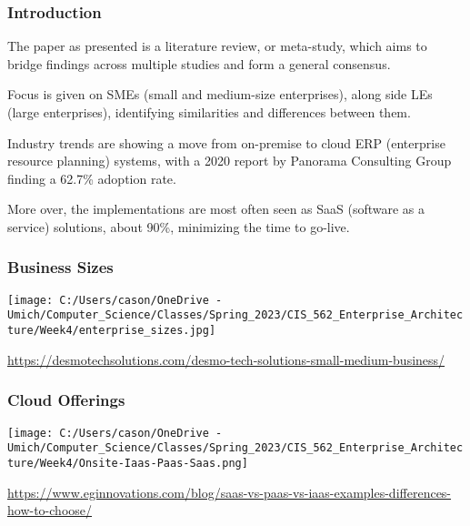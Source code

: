 \documentclass{beamer}
\begin{document}
\begin{frame}

    \frametitle{Introduction}

    The paper as presented is a literature review, or meta-study, which aims to bridge findings across multiple studies and form a general consensus. \pause

    \vspace{3.33mm}
    Focus is given on SMEs (small and medium-size enterprises), along side LEs (large enterprises), identifying similarities and differences between them. \pause

    \vspace{3.33mm}
    Industry trends are showing a move from on-premise to cloud ERP (enterprise resource planning) systems, with a 2020 report by Panorama Consulting Group finding a 62.7\% adoption rate. \pause
    
    \vspace{3.33mm}
    More over, the implementations are most often seen as SaaS (software as a service) solutions, about 90\%, minimizing the time to go-live.

\end{frame}

\begin{frame}

    \frametitle{Business Sizes}

    \centering
    \texttt{[image: C:/Users/cason/OneDrive - Umich/Computer\_Science/Classes/Spring\_2023/CIS\_562\_Enterprise\_Architecture/Week4/enterprise\_sizes.jpg]}

    \footnotesize {\url{https://desmotechsolutions.com/desmo-tech-solutions-small-medium-business/}}

\end{frame}

\begin{frame}

    \frametitle{Cloud Offerings}

    \centering
    \texttt{[image: C:/Users/cason/OneDrive - Umich/Computer\_Science/Classes/Spring\_2023/CIS\_562\_Enterprise\_Architecture/Week4/Onsite-Iaas-Paas-Saas.png]}

    \footnotesize {\url{https://www.eginnovations.com/blog/saas-vs-paas-vs-iaas-examples-differences-how-to-choose/}}

\end{frame}

\end{document}
